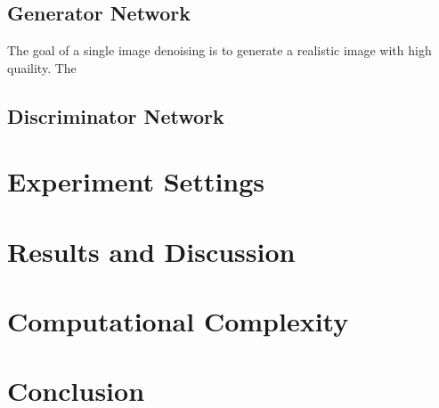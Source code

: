 \documentclass[journal]{IEEEtran}
\begin{document}
\subsection{Generator Network}
\label{generator}
The goal of a single image denoising is to generate a realistic image with high quaility.  The 

\subsection{Discriminator Network}
\label{discriminator}


\section{Experiment Settings}
\label{experiment settings}

\section{Results and Discussion}
\label{results and discussion}

\section{Computational Complexity}
\label{complexity}

\section{Conclusion}
\label{conclusion}



\end{document}
